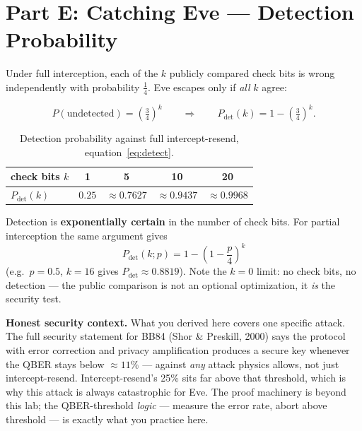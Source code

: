 \documentclass[a4paper,11pt]{article}
\begin{document}
\section{Part E: Catching Eve --- Detection Probability}

Under full interception, each of the $k$ publicly compared check bits is wrong
independently with probability $\tfrac{1}{4}$. Eve escapes only if \emph{all} $k$
agree:

\begin{equation}
    P(\text{undetected}) = \left(\tfrac{3}{4}\right)^k
    \qquad\Longrightarrow\qquad
    P_{\text{det}}(k) = 1 - \left(\tfrac{3}{4}\right)^k.
    \label{eq:detect}
\end{equation}

\begin{table}[H]
\centering
\begin{tabular}{lcccc}
\toprule
check bits $k$      & 1      & 5      & 10     & 20     \\
\midrule
$P_{\text{det}}(k)$ & $0.25$ & $\approx 0.7627$ & $\approx 0.9437$ & $\approx 0.9968$ \\
\bottomrule
\end{tabular}
\caption{Detection probability against full intercept-resend,
equation~\eqref{eq:detect}.}
\label{tab:detect}
\end{table}

\noindent Detection is \textbf{exponentially certain} in the number of check bits.
For partial interception the same argument gives
\begin{equation}
    P_{\text{det}}(k; p) = 1 - \left(1 - \frac{p}{4}\right)^k
    \label{eq:detectp}
\end{equation}
(e.g.\ $p = 0.5$, $k = 16$ gives $P_{\text{det}} \approx 0.8819$). Note the
$k = 0$ limit: no check bits, no detection --- the public comparison is not an
optional optimization, it \emph{is} the security test.

\begin{warningbox}
\textbf{Honest security context.} What you derived here covers one specific attack.
The full security statement for BB84 (Shor \& Preskill, 2000) says the protocol
with error correction and privacy amplification produces a secure key whenever the
QBER stays below $\approx 11\%$ --- against \emph{any} attack physics allows, not
just intercept-resend. Intercept-resend's 25\% sits far above that threshold, which
is why this attack is always catastrophic for Eve. The proof machinery is beyond
this lab; the QBER-threshold \emph{logic} --- measure the error rate, abort above
threshold --- is exactly what you practice here.
\end{warningbox}
\end{document}
